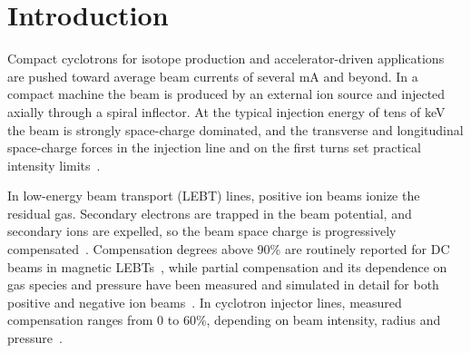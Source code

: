 \documentclass[aps,prab,10pt,twocolumn,superscriptaddress,showpacs,floatfix]{revtex4-2}
\begin{document}
\begin{abstract}
electrons for \numstCWtauc~$\mu$s on the production grid, keeping \numstCWeta{} core
compensation; narrow plugs shorten the confinement and degrade the beam. Envelope and particle
tracking to the spiral inflector show that compensation in the cell alone is not sufficient:
90\% transmission into the inflector acceptance needs a downstream compensation of
\numstCWtwoetaninety--0.9 along the solenoid and quadrupoles, whereas the electron retention
there limits residual-gas compensation at $\numpHtwo$~Torr to $\lesssim\numstCWthreeetasol$.
Bunched-beam simulations show that the electrons do not follow strong bunches, so only the
RF-averaged compensation applies, and a sine-bunched beam from the baseline buncher position
delivers only \numstBfiveGbasea{} of the DC accepted current. The design therefore hinges on
electron confinement downstream of the cell and on where and how the beam is bunched.
\end{abstract}

\maketitle

\section{Introduction}
\label{sec:intro}

Compact cyclotrons for isotope production and accelerator-driven applications are
pushed toward average beam currents of several mA and beyond. In a compact machine the
beam is produced by an external ion source and injected axially through a spiral
inflector. At the typical injection energy of tens of keV the beam is strongly
space-charge dominated, and the transverse and longitudinal space-charge forces in the
injection line and on the first turns set practical intensity limits~\cite{Baartman1995}.

In low-energy beam transport (LEBT) lines, positive ion beams ionize the residual gas.
Secondary electrons are trapped in the beam potential, and secondary ions are
expelled, so the beam space charge is progressively compensated~\cite{Gabovich1977,Reiser2008}.
Compensation degrees above 90\% are routinely reported for DC beams in magnetic
LEBTs~\cite{Chauvin2012,BenIsmail2007}, while partial compensation and its dependence
on gas species and pressure have been measured and simulated in detail for both positive
and negative ion beams~\cite{ValerioLizarraga2015,Soloshenko2004}. In cyclotron injector
lines, measured compensation ranges from 0 to 60\%, depending on beam intensity,
radius and pressure~\cite{Winklehner2013}.
\end{document}
